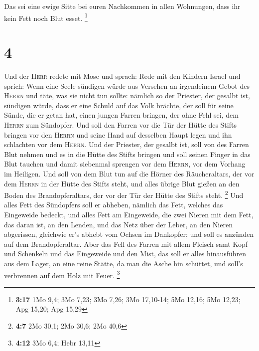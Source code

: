  Das sei eine ewige Sitte bei euren Nachkommen in allen
Wohnungen, dass ihr kein Fett noch Blut esset. \footnote{\textbf{3:17}
  1Mo 9,4; 3Mo 7,23; 3Mo 7,26; 3Mo 17,10-14; 5Mo 12,16; 5Mo 12,23; Apg
  15,20; Apg 15,29}

\hypertarget{section-1}{%
\section{4}\label{section-1}}

 Und der \textsc{Herr} redete mit Mose und sprach:
 Rede mit den Kindern Israel und sprich: Wenn eine Seele
sündigen würde aus Versehen an irgendeinem Gebot des \textsc{Herrn} und
täte, was sie nicht tun sollte:  nämlich so der Priester,
der gesalbt ist, sündigen würde, dass er eine Schuld auf das Volk
brächte, der soll für seine Sünde, die er getan hat, einen jungen Farren
bringen, der ohne Fehl sei, dem \textsc{Herrn} zum Sündopfer.
 Und soll den Farren vor die Tür der Hütte des Stifts
bringen vor den \textsc{Herrn} und seine Hand auf desselben Haupt legen
und ihn schlachten vor dem \textsc{Herrn}.  Und der
Priester, der gesalbt ist, soll von des Farren Blut nehmen und es in die
Hütte des Stifts bringen  und soll seinen Finger in das
Blut tauchen und damit siebenmal sprengen vor dem \textsc{Herrn}, vor
dem Vorhang im Heiligen.  Und soll von dem Blut tun auf
die Hörner des Räucheraltars, der vor dem \textsc{Herrn} in der Hütte
des Stifts steht, und alles übrige Blut gießen an den Boden des
Brandopferaltars, der vor der Tür der Hütte des Stifts steht.
\footnote{\textbf{4:7} 2Mo 30,1; 2Mo 30,6; 2Mo 40,6}  Und
alles Fett des Sündopfers soll er abheben, nämlich das Fett, welches das
Eingeweide bedeckt, und alles Fett am Eingeweide,  die
zwei Nieren mit dem Fett, das daran ist, an den Lenden, und das Netz
über der Leber, an den Nieren abgerissen,  gleichwie er's
abhebt vom Ochsen im Dankopfer; und soll es anzünden auf dem
Brandopferaltar.  Aber das Fell des Farren mit allem
Fleisch samt Kopf und Schenkeln und das Eingeweide und den Mist,
 das soll er alles hinausführen aus dem Lager, an eine
reine Stätte, da man die Asche hin schüttet, und soll's verbrennen auf
dem Holz mit Feuer. \footnote{\textbf{4:12} 3Mo 6,4; Hebr 13,11}

